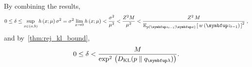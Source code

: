 \begin{proofEnd}
By combining the results, 
\begin{align}
  0 \leq \delta
  \leq \sup_{x \in (a,b)} h\,(x; \mu) \, \sigma^2
  = \sigma^2 \lim_{x \rightarrow 0} h\,(x; \mu) 
  < \frac{\sigma^2}{\mu^2}
  < \frac{Z^2 M }{\mu^2}
  < \frac{
    Z^2 \, M
  }
  {
    {\Esub{p(\vz_{t-1}\mid\vx)}{ w\,(\vz_{t-1}) }}^2 
  }\;,
\end{align}
and by~\cref{thm:rej_kl_bound},
\begin{equation}
  0 \leq \delta < \frac{ M }{ \exp^2\,\big( \DKL{p}{q_{\vlambda}} \big) }.
\end{equation}
\end{proofEnd}

